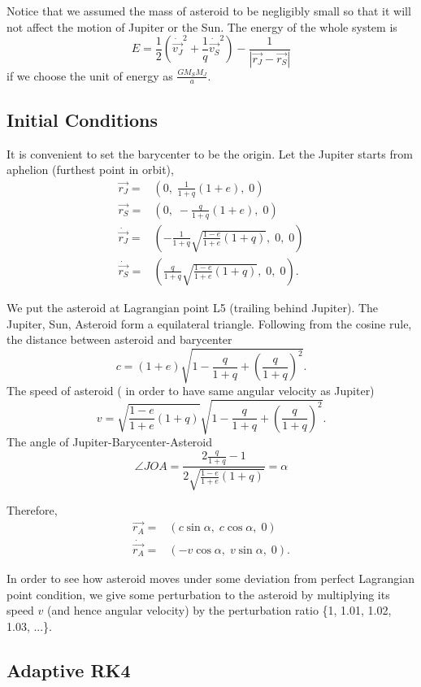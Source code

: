 \documentclass[12pt,a4paper]{article}
\begin{document}
Notice that we assumed the mass of asteroid to be negligibly small so that it will not affect the motion of Jupiter or the Sun. The energy of the whole system is 
\begin{equation}
E = \frac{1}{2} \left({\dot{\vec{v_J}}}^2 +  \frac{1}{q} {\dot{\vec{v_S}}}^2 \right) - \frac{1}{|\vec{r_J}-\vec{r_S}|}
\end{equation}
if we choose the unit of energy as $\displaystyle{\frac{GM_{S}M_{J}}{a}}$.


\subsection{Initial Conditions}
It is convenient to set the barycenter to be the origin.
Let the Jupiter starts from aphelion (furthest point in orbit),
\begin{align}
	\vec{r_J} =& (0, \; \frac{1}{1+q} (1+e), \; 0) \\
	\vec{r_S} =& (0, \; -\frac{q}{1+q} (1+e), \; 0) \\
	\dot{\vec{r_J}} =& (-\frac{1}{1+q} \sqrt{\frac{1-e}{1+e}(1+q)}, \; 0, \; 0) \\
	\dot{\vec{r_S}} =& (\frac{q}{1+q} \sqrt{\frac{1-e}{1+e}(1+q)}, \; 0, \; 0).
\end{align}

We put the asteroid at Lagrangian point L5 (trailing behind Jupiter). The Jupiter, Sun, Asteroid form a equilateral triangle. Following from the cosine rule, the distance between asteroid and barycenter
\[
c = (1+e)\sqrt{1-\frac{q}{1+q}+{\left(\frac{q}{1+q}\right)}^2}.
\]
The speed of asteroid ( in order to have same angular velocity as Jupiter)
\[
v =     \sqrt{\frac{1-e}{1+e}(1+q)}   \sqrt{1-\frac{q}{1+q}+{\left(\frac{q}{1+q}\right)}^2}.
\]
The angle of Jupiter-Barycenter-Asteroid
\[
\angle JOA  = \frac{ 2 \frac{q}{1+q}-1}{2 \sqrt{\frac{1-e}{1+e}(1+q)}} = \alpha
\]

Therefore,
\begin{align}
	\vec{r_A} =& (c \sin{\alpha},  \; c \cos{\alpha}, \; 0) \\
	\dot{\vec{r_A}} =& (-v \cos{\alpha},  \; v \sin{\alpha}, \; 0).
\end{align}

In order to see how asteroid moves under some deviation from perfect Lagrangian point condition, we give some perturbation to the asteroid by multiplying its speed $v$ (and hence angular velocity) by the perturbation ratio \{1, 1.01, 1.02, 1.03, ...\}.

\subsection{Adaptive RK4}
\end{document}
